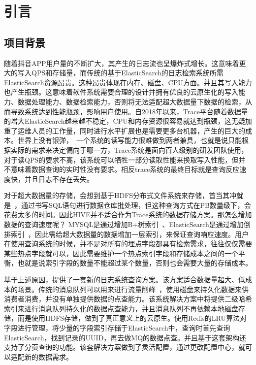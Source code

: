 \chapter{引言}



\section{项目背景}
随着抖音APP用户量的不断扩大，其产生的日志流也呈爆炸式增长。这意味着更大的写入QPS和存储量，而传统的基于ElasticSearch的日志检索系统所需ElasticSearch资源昂贵。这种昂贵体现在内存、磁盘、CPU方面。并且其写入能力也产生瓶颈。这意味着软件系统需要合理的设计并拥有优良的云原生化的写入能力、数据处理能力、数据检索能力，否则将无法适配超大数据量下数据的检索，从而导致系统达到性能瓶颈，影响用户使用。自2018年以来，Trace平台随着数据量的增大ElasticSearch越来越不稳定，CPU和内存资源很容易就达到瓶颈，这无疑加重了运维人员的工作量，同时进行水平扩展也是需要更多台机器，产生的巨大的成本。世界上没有银弹，~\cite{金芝2019寻找软件开发的}一个系统的读写能力很难做到两者兼具，也就是说只能根据实际的需求来决定偏向于哪一方，Trace系统是面向百人级别的研发团队使用，对于读QPS的要求不高，该系统可以牺牲一部分读取性能来换取写入性能，但并不意味着数据查询的实时性没有要求。相反trace系统的最终目标就是查询反应速度快，并且日志不存在丢失。

对于超大数据量的存储，会想到基于HDFS分布式文件系统来存储，首当其冲就是~\cite{赵龙2013基于}，通过书写SQL语句进行数据仓库批处理，但这种查询方式在PB数量级下，会花费太多的时间。因此HIVE并不适合作为Trace系统的数据存储方案。那怎么增加数据的查询速度呢？ MYSQL是通过增加B+树索引~\cite{孙文隽1999并行}、ElasticSearch是通过增加倒排索引~\cite{郑榕增2010基于}，因此需给超大数据量的数据增加一层索引，来保证查询响应速度。用户在使用查询系统的时候，并不是对所有的埋点字段都具有检索需求，往往仅仅需要某些热点字段就可以，因此需要维护一个热点索引字段和存储成本之间的一个平衡，也就是说索引字段的数量不能超过某个数量，否则也会需要大量的存储成本。

基于上述原因，提供了一套新的日志系统查询方案。该方案适合数据量超大、低成本的场景。传统的消息队列可以用来进行流量削峰~\cite{郑榕增2010基于}，使用磁盘来持久化数据来供消费者消费，并没有单独提供数据的点查能力。该系统解决方案中将提供二级哈希索引来进行消息队列持久化的数据点查能力，并且消息队列不再依赖本地磁盘存储，而是使用HDFS存储，做到了真正意义上的云原生。使用Redis的LRU算法对字段进行管理，将少量的字段索引存储于ElasticSearch中，查询时首先查询ElasticSearch，找到记录的UUID，再去做MQ的数据点查。并且基于这套架构还支持了分页查询的功能。该套解决方案做到了灵活配置，通过更改配置中心，就可以适配新的数据需求。


